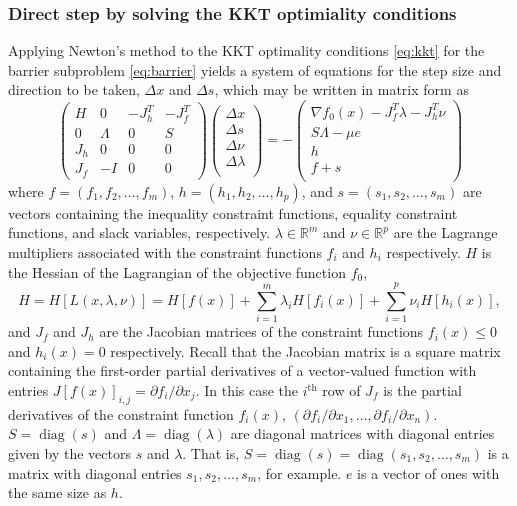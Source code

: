 \subsubsection*{Direct step by solving the KKT optimiality conditions}
Applying Newton's method to the KKT optimality conditions \eqref{eq:kkt} for the barrier subproblem \eqref{eq:barrier} yields a system of equations for the step size and direction to be taken, $\Delta x$ and $\Delta s$, which may be written in matrix form as \citep[p. 566]{Nocedal06}
\begin{equation}
\begin{pmatrix}
H   & 0       & -J_h^T & -J_f^T \\
0   & \Lambda & 0      & S \\
J_h & 0       & 0      & 0 \\
J_f & -I      & 0      & 0
\end{pmatrix}
\begin{pmatrix}
\Delta x  \\
\Delta s  \\
\Delta \nu \\
\Delta \lambda \\
\end{pmatrix}
= -
\begin{pmatrix}
\nabla f_0(x) - J_f^T \lambda - J_h^T \nu  \\
S\Lambda - \mu e \\
h \\
f + s \\
\end{pmatrix}
\end{equation}
where $f = (f_1, f_2, \dots, f_m)$, $h = (h_1, h_2, \dots, h_p)$, and $s = (s_1, s_2, \dots, s_m)$ are vectors containing the inequality constraint functions, equality constraint functions, and slack variables, respectively. $\lambda \in \mathbb{R}^m$ and $\nu \in \mathbb{R}^p$ are the Lagrange multipliers associated with the constraint functions $f_i$ and $h_i$ respectively. $H$ is the Hessian of the Lagrangian of the objective function $f_0$,
\begin{equation}
H = H[L(x,\lambda,\nu)] = H[f(x)] + \sum_{i=1}^m \lambda_i H[f_i(x)] + \sum_{i=1}^p \nu_i H[h_i(x)],
\end{equation}
and $J_f$ and $J_h$ are the Jacobian matrices of the constraint functions $f_i(x) \le 0$ and $h_i(x) = 0$ respectively. Recall that the Jacobian matrix is a square matrix containing the first-order partial derivatives of a vector-valued function with entries $J[f(x)]_{i,j} = \partial f_i / \partial x_j$. In this case the $i^\mathrm{th}$ row of $J_f$ is the partial derivatives of the constraint function $f_i(x)$, $(\partial f_i/\partial x_1, \dots, \partial f_i/\partial x_n)$. $S = \operatorname{diag}(s)$ and $\Lambda = \operatorname{diag}(\lambda)$ are diagonal matrices with diagonal entries given by the vectors $s$ and $\lambda$. That is, $S = \operatorname{diag}(s) = \operatorname{diag}(s_1, s_2, \dots, s_m)$ is a matrix with diagonal entries $s_1, s_2, \dots, s_m$, for example. $e$ is a vector of ones with the same size as $h$.

